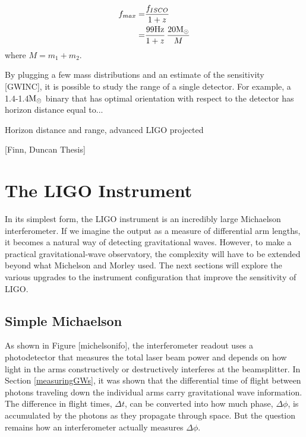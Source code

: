 	\begin{equation}
	\begin{aligned}
	f_{max}	=&  \frac{f_{ISCO}}{1+z} \\
			=&	\frac{99 \text{Hz}}{1+z} \, \frac{20 \textup{M}_\odot}{M}
	\end{aligned}
	\end{equation}
	where $M=m_1+m_2$.
	
	
	By plugging a few mass distributions and an estimate of the sensitivity [GWINC], it is possible to study the range of a single detector.  For example, a 1.4-1.4$\textup{M}_\odot$ binary that has optimal orientation with respect to the detector has horizon distance equal to...
	
	Horizon distance and range, advanced LIGO projected
	
	[Finn, Duncan Thesis]
	\cite{Saulson}
	
	\section{The LIGO Instrument}\label{LIGOInstrument}
	In its simplest form, the LIGO instrument is an incredibly large Michaelson interferometer.  
	If we imagine the output as a measure of differential arm lengths, it becomes a natural way of detecting gravitational waves. However, to make a practical gravitational-wave observatory, the complexity will have to be extended beyond what Michelson and Morley used.  
	The next sections will explore the various upgrades to the instrument configuration that improve the sensitivity of LIGO.
	
		\subsection{Simple Michaelson}\label{michelson}
		As shown in Figure [michelsonifo], the interferometer readout uses a photodetector that measures the total laser beam power and depends on how light in the arms constructively or destructively interferes at the beamsplitter. 
		In Section \ref{measuringGWs}, it was shown that the differential time of flight between photons traveling down the individual arms carry gravitational wave information.  
		The difference in flight times, $\Delta t$, can be converted into how much phase, $\Delta \phi$, is accumulated by the photons as they propagate through space.  
		But the question remains how an interferometer actually measures $\Delta \phi$.
		
